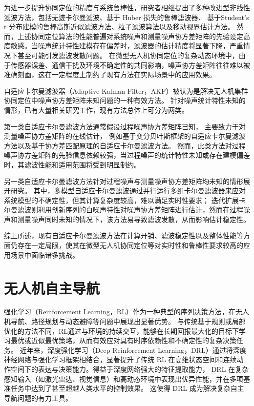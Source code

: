 为进一步提升协同定位的精度与系统鲁棒性，研究者相继提出了多种改进型非线性滤波方法，包括无迹卡尔曼滤波\cite{allotta2016development}、基于 Huber 损失的鲁棒滤波器\cite{bo2019cooperative}、 基于Student’s t 分布建模的鲁棒高斯近似滤波方法\cite{huang2017new}、粒子滤波算法\cite{akai2023reliable}以及移动视界估计方法\cite{wang2023neural}。
然而，上述协同定位算法的性能普遍对系统噪声和测量噪声协方差矩阵的先验设定高度敏感。当噪声统计特性建模存在偏差时，滤波器的估计精度将显著下降，严重情况下甚至可能引发滤波发散问题。
在微型无人机协同定位的复杂动态环境中，由于传感器误差、通信干扰及环境不确定性的共同影响，噪声协方差矩阵往往难以被准确刻画，这在一定程度上制约了现有方法在实际场景中的应用效果。

自适应卡尔曼滤波器（Adaptive Kalman Filter，AKF）被认为是解决无人机集群协同定位中噪声协方差矩阵未知问题的一种有效方法\cite{kruse2025adaptive}。
针对噪声统计特性未知的情形，已有大量相关研究工作，现有方法总体上可分为两类。

第一类自适应卡尔曼滤波方法通常假设过程噪声协方差矩阵已知，
主要致力于对测量噪声协方差矩阵的在线估计，
例如基于变分贝叶斯框架的自适应卡尔曼滤波方法\cite{davari2019variational}以及基于协方差匹配原理的自适应卡尔曼滤波方法\cite{hajiyev2023covariance}。
然而，此类方法对过程噪声协方差矩阵的先验信息依赖较强，当过程噪声的统计特性未知或存在建模偏差时，其滤波性能和适用范围将受到明显制约。

另一类自适应卡尔曼滤波方法针对过程噪声与测量噪声协方差矩阵均未知的情形展开研究。
其中，多模型自适应卡尔曼滤波通过并行运行多组卡尔曼滤波器来应对系统模型的不确定性，但其计算复杂度较高，难以满足实时性要求\cite{youn2020novel}；
迭代扩展卡尔曼滤波则利用创新序列的白噪声特性对噪声协方差矩阵进行估计，然而在过程噪声和测量噪声同时未知的情况下，该方法易导致滤波发散，从而影响估计稳定性\cite{lin2022efficient}。

综上所述，现有自适应卡尔曼滤波方法在计算开销、滤波稳定性以及整体性能等方面仍存在一定局限，使其在微型无人机协同定位等对实时性和鲁棒性要求较高的应用场景中面临诸多挑战。

\section{无人机自主导航}
强化学习（Reinforcement Learning，RL）作为一种典型的序列决策方法，在无人机导航、路径规划与动态避障等问题中展现出显著优势。
与传统基于规则或局部优化的方法不同，RL通过与环境的持续交互，能够在长期回报最大化的目标下学习最优或近似最优策略，从而有效应对具有时序依赖性和不确定性的复杂决策任务\cite{ding2020introduction,clifton2020q}。
近年来，深度强化学习（Deep Reinforcement Learning，DRL）通过将深度神经网络与强化学习框架相结合，显著提升了传统 RL 在高维状态空间和连续动作空间下的表达与决策能力。得益于深度网络强大的特征提取能力，
DRL 在复杂感知输入（如激光雷达、视觉信息）和高动态环境中表现出优异性能，并在多项基准任务中达到了甚至超越人类水平的控制效果\cite{li2023deep,mnih2015human,tang2025deep}。
这使得 DRL 成为解决复杂自主导航问题的有力工具。

